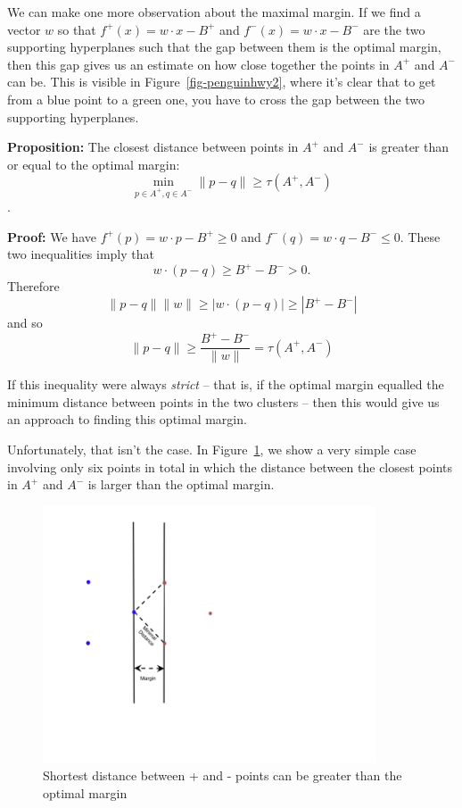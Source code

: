 \documentclass[
  11pt,
  letterpaper,
]{scrbook}
\theoremstyle{plain}
\theoremstyle{plain}
\theoremstyle{remark}
\begin{document}
We can make one more observation about the maximal margin. If we find a
vector \(w\) so that \(f^{+}(x) = w\cdot x -B^{+}\) and
\(f^{-}(x) = w\cdot x-B^{-}\) are the two supporting hyperplanes such
that the gap between them is the optimal margin, then this gap gives us
an estimate on how close together the points in \(A^{+}\) and \(A^{-}\)
can be. This is visible in Figure~\ref{fig-penguinhwy2}, where it's
clear that to get from a blue point to a green one, you have to cross
the gap between the two supporting hyperplanes.

\textbf{Proposition:} The closest distance between points in \(A^{+}\)
and \(A^{-}\) is greater than or equal to the optimal margin: \[
\min_{p\in A^{+},q\in A^{-}} \|p-q\|\ge \tau(A^{+},A^{-})
\].

\textbf{Proof:} We have \(f^{+}(p) = w\cdot p - B^{+}\ge 0\) and
\(f^{-}(q) = w\cdot q -B^{-}\le 0\). These two inequalities imply that
\[
w\cdot (p-q)\ge B^{+}-B^{-}>0.
\] Therefore \[
\|p-q\|\|w\|\ge |w\cdot (p-q)|\ge |B^{+}-B^{-}|
\] and so \[
\|p-q\| \ge \frac{B^{+}-B^{-}}{\|w\|} = \tau(A^{+},A^{-})
\]

If this inequality were always \emph{strict} -- that is, if the optimal
margin equalled the minimum distance between points in the two clusters
-- then this would give us an approach to finding this optimal margin.

Unfortunately, that isn't the case. In Figure~\ref{fig-nonstrict}, we
show a very simple case involving only six points in total in which the
distance between the closest points in \(A^{+}\) and \(A^{-}\) is larger
than the optimal margin.

\begin{figure}

{\centering \includegraphics[width=\textwidth,height=3in]{chapters/img/margindistance2.png}

}

\caption{\label{fig-nonstrict}Shortest distance between + and - points
can be greater than the optimal margin}

\end{figure}
\end{document}
